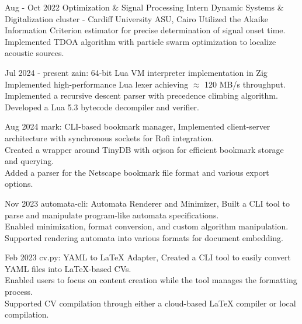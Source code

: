\documentclass[]{report}
\begin{document}
\entry
    {Aug - Oct 2022}
    {Optimization \& Signal Processing Intern}
    {Dynamic Systems \& Digitalization cluster - Cardiff University}
    {ASU, Cairo}
    {
      \tb Utilized the Akaike Information Criterion estimator for precise determination of signal onset time.\\
      \tb Implemented TDOA algorithm with particle swarm optimization to localize acoustic sources.
    }

\newpage
{}

\entry
    {Jul 2024 - present}
    {zain: 64-bit Lua VM interpreter implementation in Zig}
    {}{}
    {
        \tb Implemented high-performance Lua lexer achieving $\approx$ 120 MB/s throughput.\\
        \tb Implemented a recursive descent parser with precedence climbing algorithm.\\
        \tb Developed a Lua 5.3 bytecode decompiler and verifier.
    }


\entry
    {Aug 2024}
    {mark: CLI-based bookmark manager, }
    {} {}
    {
        \tb Implemented client-server architecture with synchronous sockets for Rofi integration.\\
        \tb Created a wrapper around TinyDB with orjson for efficient bookmark storage and querying.\\ 
        \tb Added a parser for the Netscape bookmark file format and various export options.
    }

\entry
    {Nov 2023}
    {automata-cli: Automata Renderer and Minimizer, }
    {} {}
    {
        \tb Built a CLI tool to parse and manipulate program-like automata specifications. \\ 
        \tb Enabled minimization, format conversion, and custom algorithm manipulation. \\ 
        \tb Supported rendering automata into various formats for document embedding.
    }

\entry
    {Feb 2023}
    {cv.py: YAML to LaTeX Adapter, }
    {} {}  
    {
        \tb Created a CLI tool to easily convert YAML files into LaTeX-based CVs.\\
        \tb Enabled users to focus on content creation while the tool manages the formatting process.\\
        \tb Supported CV compilation through either a cloud-based LaTeX compiler or local compilation.
    }
\end{document}
